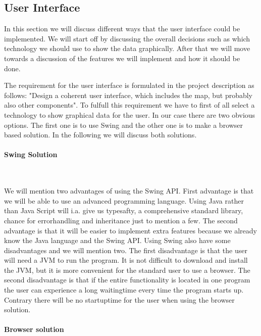 \documentclass[a4paper,10pt,titlepage]{article}
\begin{document}
			\subsection{User Interface}

				In this section we will discuss different ways that the user interface could be implemented. We will start off by discussing the overall decisions such as which technology we should use to show the data graphically. After that we will move towards a discussion of the features we will implement and how it should be done.  

The requirement for the user interface is formulated in the project description as follows: "Design a coherent user interface, which includes the map, but probably also other components". To fulfull this requirement we have to first of all select a technology to show graphical data for the user. In our case there are two obvious options. The first one is to use Swing and the other one is to make a browser based solution. In the following we will discuss both solutions.

\paragraph{Swing Solution}\mbox{}\

We will mention two advantages of using the Swing API. First advantage is that we will be able to use an advanced programming language. Using Java rather than Java Script will i.a. give us typesafty, a comprehensive standard library, chance for errorhandling and inheritance just to mention a few. The second advantage is that it will be easier to implement extra features because we already know the Java language and the Swing API. Using Swing also have some disadvantages and we will mention two. The first disadvantage is that the user will need a JVM to run the program. It is not difficult to download and install the JVM, but it is more convenient for the standard user to use a browser. The second disadvantage is that if the entire functionality is located in one program the user can experience a long waitingtime every time the program starts up. Contrary there will be no startuptime for the user when using the browser solution. 

\paragraph{Browser solution}\mbox{}\
\end{document}
